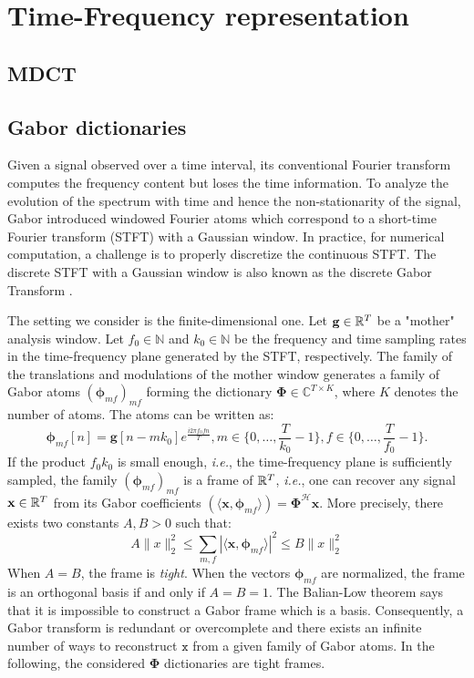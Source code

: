 \section{Time-Frequency representation}
\label{section:TF}
\subsection{MDCT}
\subsection{Gabor dictionaries}
Given a signal observed over a time interval, its conventional Fourier transform computes the frequency content but loses the time information. To analyze the evolution of the spectrum with time and hence the non-stationarity of the signal, Gabor introduced windowed Fourier atoms which correspond to a short-time Fourier transform (STFT) with a Gaussian window. In practice, for numerical computation, a challenge is to properly discretize the continuous STFT. The discrete STFT with a Gaussian window is also known as the discrete Gabor Transform \cite{gabor1946theory}.

The setting we consider is the finite-dimensional one. Let $\mathbf{g}\in \mathbb{R}^{T}$ be a "mother" analysis window. Let $f_0\in \mathbb{N}$ and $k_0\in \mathbb{N}$ be the frequency and time sampling rates in the time-frequency plane generated by the STFT, respectively. The family of the translations and modulations of the mother window generates a family of Gabor atoms $(\mathbf{\phi}_{mf})_{mf}$ forming the dictionary $\mathbf{\Phi}\in \mathbb{C}^{T\times K}$, where $K$ denotes the number of atoms. The atoms can be written as:
\begin{equation} \label{eq_gabor_atoms}
	\mathbf{\phi}_{mf}[n] = \mathbf{g}[n-mk_0]e^{\frac{i2\pi f_0 fn}{T}}, m\in \{0,\dots ,\frac{T}{k_0}-1\}, f\in \{0,\dots ,\frac{T}{f_0}-1\}.
\end{equation}
If the product $f_0k_0$ is small enough, \textit{i.e.}, the time-frequency plane is sufficiently sampled, the family $(\mathbf{\phi}_{mf})_{mf}$ is a frame of $\mathbb{R}^T$, \textit{i.e.}, one can recover any signal $\mathbf{x}\in \mathbb{R}^T$ from its Gabor coefficients $(\langle \mathbf{x}, \mathbf{\phi}_{mf}\rangle)=\mathbf{\Phi}^{\mathcal{H}}\mathbf{x}$. More precisely, there exists two constants $A, B > 0$ such that:
\begin{equation} \label{eq_frame}
	A\|x\|_2^2 \leq \sum_{m,f}|\langle \mathbf{x}, \mathbf{\phi}_{mf}\rangle|^2\leq B\|x\|_2^2   
\end{equation}
When $A=B$, the frame is \textit{tight}. When the vectors $\mathbf{\phi}_{mf}$ are normalized, the frame is an orthogonal basis if and only if $A=B=1$. The Balian-Low theorem says that it is impossible to construct a Gabor frame which is a basis. Consequently, a Gabor transform is redundant or overcomplete and there exists an infinite number of ways to reconstruct $\mathtt{x}$ from a given family of Gabor atoms. In the following, the considered $\mathbf{\Phi}$ dictionaries are tight frames.

